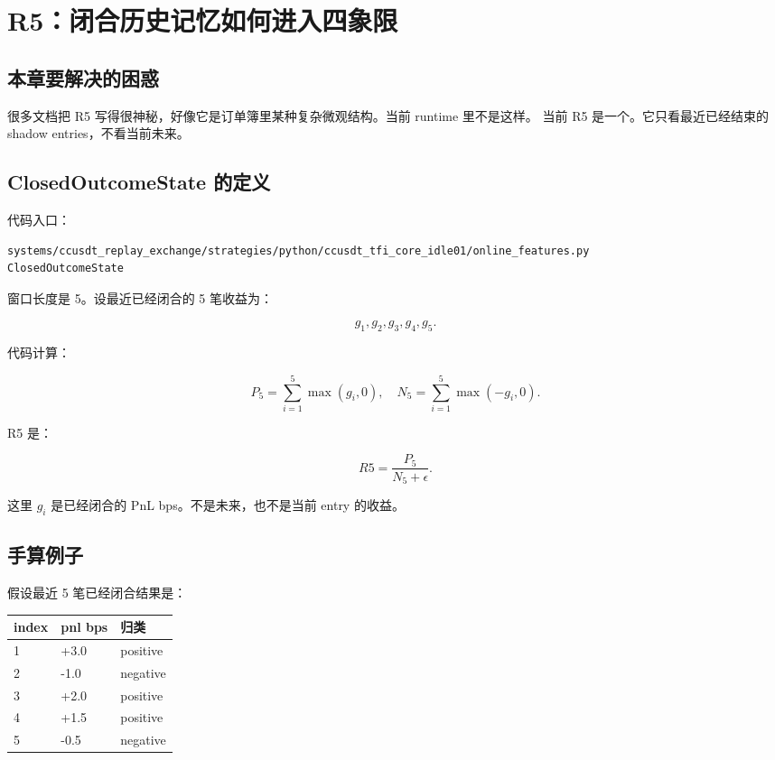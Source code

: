 \chapter{R5：闭合历史记忆如何进入四象限}

\section{本章要解决的困惑}

很多文档把 R5 写得很神秘，好像它是订单簿里某种复杂微观结构。当前 runtime 里不是这样。
当前 R5 是一个。它只看最近已经结束的 shadow entries，不看当前未来。


\section{ClosedOutcomeState 的定义}

代码入口：

\begin{lstlisting}
systems/ccusdt_replay_exchange/strategies/python/ccusdt_tfi_core_idle01/online_features.py
ClosedOutcomeState
\end{lstlisting}

窗口长度是 5。设最近已经闭合的 5 笔收益为：

\[
g_1,g_2,g_3,g_4,g_5.
\]

代码计算：

\[
P_5=\sum_{i=1}^{5} \max(g_i,0),
\quad
N_5=\sum_{i=1}^{5} \max(-g_i,0).
\]

R5 是：

\[
R5=\frac{P_5}{N_5+\epsilon}.
\]

这里 \(g_i\) 是已经闭合的 PnL bps。不是未来，也不是当前 entry 的收益。

\section{手算例子}

假设最近 5 笔已经闭合结果是：

\begin{longtable}{p{}p{}p{}}
\toprule
index & pnl bps & 归类 \\
\midrule
1 & +3.0 & positive \\
2 & -1.0 & negative \\
3 & +2.0 & positive \\
4 & +1.5 & positive \\
5 & -0.5 & negative \\
\bottomrule
\end{longtable}

